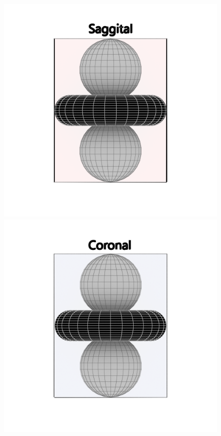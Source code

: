 \documentclass{article}
\begin{document}
\begin{figure}[h]
    \centering
    \begin{minipage}{0.3\textwidth}
        \centering
        \includegraphics[width=\textwidth]{img/sus-saggital.png}
    \end{minipage}\hfill
    \begin{minipage}{0.3\textwidth}
        \centering
        \includegraphics[width=\textwidth]{img/sus-coronal.png}

\end{minipage}
\end{figure}
\end{document}
